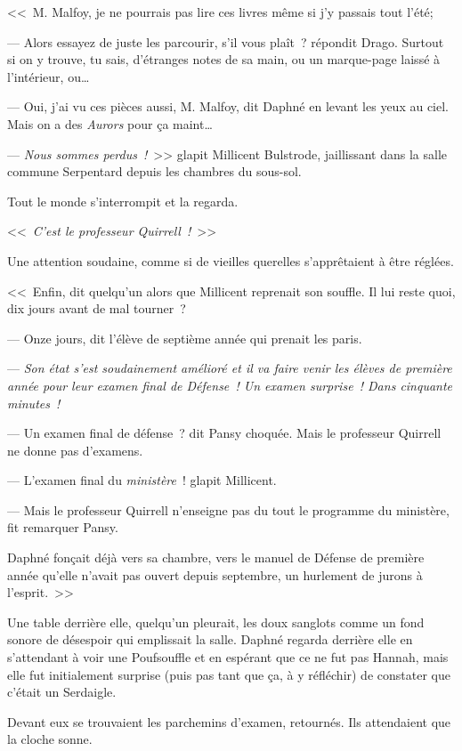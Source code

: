 <<~M. Malfoy, je ne pourrais pas lire ces livres même si j'y passais tout l'été;

--- Alors essayez de juste les parcourir, s'il vous plaît~? répondit Drago. Surtout si on y trouve, tu sais, d'étranges notes de sa main, ou un marque-page laissé à l'intérieur, ou…

--- Oui, j'ai vu ces pièces aussi, M. Malfoy, dit Daphné en levant les yeux au ciel. Mais on a des \emph{Aurors} pour ça maint…

--- \emph{Nous sommes perdus~!}~>> glapit Millicent Bulstrode, jaillissant dans la salle commune Serpentard depuis les chambres du sous-sol.

Tout le monde s'interrompit et la regarda.

<<~\emph{C'est le professeur Quirrell~!}~>>

Une attention soudaine, comme si de vieilles querelles s'apprêtaient à être réglées.

<<~Enfin, dit quelqu'un alors que Millicent reprenait son souffle. Il lui reste quoi, dix jours avant de mal tourner~?

--- Onze jours, dit l'élève de septième année qui prenait les paris.

--- \emph{Son état s'est soudainement amélioré et il va faire venir les élèves de première année pour leur examen final de Défense~! Un examen surprise~! Dans cinquante minutes~!}

--- Un examen final de défense~? dit Pansy choquée. Mais le professeur Quirrell ne donne pas d'examens.

--- L'examen final du \emph{ministère}~! glapit Millicent.

--- Mais le professeur Quirrell n'enseigne pas du tout le programme du ministère, fit remarquer Pansy.

Daphné fonçait déjà vers sa chambre, vers le manuel de Défense de première année qu'elle n'avait pas ouvert depuis septembre, un hurlement de jurons à l'esprit.~>>

\later

Une table derrière elle, quelqu'un pleurait, les doux sanglots comme un fond sonore de désespoir qui emplissait la salle. Daphné regarda derrière elle en s'attendant à voir une Poufsouffle et en espérant que ce ne fut pas Hannah, mais elle fut initialement surprise (puis pas tant que ça, à y réfléchir) de constater que c'était un Serdaigle.

Devant eux se trouvaient les parchemins d'examen, retournés. Ils attendaient que la cloche sonne.

